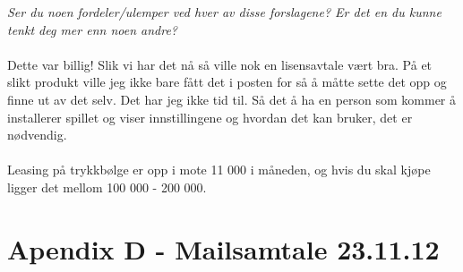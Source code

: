 \emph{Ser du noen fordeler/ulemper ved hver av disse forslagene? Er det en du kunne tenkt deg mer enn noen andre?}\\ \\
Dette var billig! Slik vi har det nå så ville nok en lisensavtale vært bra. På et slikt produkt ville jeg ikke bare fått det i posten for så å måtte sette det opp og finne ut av det selv. Det har jeg ikke tid til. Så det å ha en person som kommer å installerer spillet og viser innstillingene og hvordan det kan bruker, det er nødvendig. \\ \\
Leasing på trykkbølge er opp i mote 11 000 i måneden, og hvis du skal kjøpe ligger det mellom 100 000 - 200 000.

\newpage
\section*{Apendix D - Mailsamtale 23.11.12}
\label{D}

